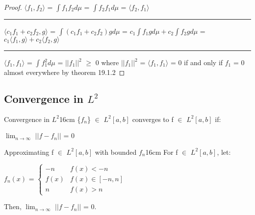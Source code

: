     \begin{proof}
        $\langle f_1,f_2 \rangle$
        = $\int f_1f_2 d\mu$
        = $\int f_2f_1 d\mu$
        = $\langle f_2,f_1 \rangle$

        \rule[0.1cm]{16.7cm}{0.01cm}

        $\langle c_1f_1 + c_2f_2 , g \rangle$
        = $\int (c_1f_1 + c_2f_2)g d\mu$
        = $c_1\int f_1g d\mu + c_2\int f_2g d\mu$
        = $c_1 \langle f_1,g \rangle + c_2 \langle f_2,g \rangle$

        \rule[0.1cm]{16.7cm}{0.01cm}

        $\langle f_1,f_1 \rangle$
        = $\int f_1^2 d\mu$
        = $||f_1||^2$ $\geq$ 0
        where $||f_1||^2$ = $\langle f_1,f_1 \rangle$ = 0
        if and only if $f_1$ = 0 almost everywhere
        by {\color{red} theorem 19.1.2}
    \end{proof}

    \newpage





\subsection{ Convergence in $L^2$ }

    \begin{definition}{Convergence in $L^2$}{16cm}
        \{$f_n$\} $\in$ $L^2[a,b]$ converges to f $\in$ $L^2[a,b]$ if:

        \hspace{0.5cm}
        $\lim_{n \rightarrow \infty}$ $||f - f_n||$ = 0
    \end{definition}

    \vspace{0.5cm}



    \begin{wtheorem}{Approximating f $\in$ $L^2[a,b]$ with bounded $f_n$}{16cm}
        For f $\in$ $L^2[a,b]$, let:

        \hspace{0.5cm}
        $f_n(x)$ =
        $\begin{cases}
            -n & f(x) < -n \\
            f(x) & f(x) \in [-n,n] \\
            n & f(x) > n
        \end{cases}$

        Then, $\lim_{n \rightarrow \infty}$ $||f - f_n||$ = 0.
    \end{wtheorem}

